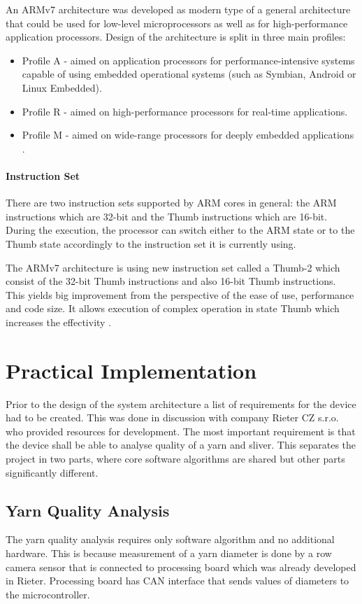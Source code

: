 \documentclass[twoside]{ctuthesis}
\theoremstyle{plain}
\theoremstyle{definition}
\theoremstyle{note}
\begin{document}
An ARMv7 architecture was developed as modern type of a general architecture that could be used for low-level microprocessors as well as for high-performance application processors. Design of the architecture is split in three main profiles:
\begin{itemize}
	\setlength{\itemsep}{5pt}
	\item Profile A - aimed on application processors for performance-intensive systems capable of using embedded operational systems (such as Symbian, Android or Linux Embedded).
	\item Profile R - aimed on high-performance processors for real-time applications.
	\item Profile M - aimed on wide-range processors for deeply embedded applications \cite{cite:ARM-M3}.
\end{itemize}

\subsubsection{Instruction Set}
There are two instruction sets supported by ARM cores in general: the ARM instructions which are 32-bit and the Thumb instructions which are 16-bit. During the execution, the processor can switch either to the ARM state or to the Thumb state accordingly to the instruction set it is currently using.

The ARMv7 architecture is using new instruction set called a Thumb-2 which consist of the 32-bit Thumb instructions and also 16-bit Thumb instructions. This yields big improvement from the perspective of the ease of use, performance and code size. It allows execution of complex operation in state Thumb which increases the effectivity \cite{cite:ARM-M3}.

\chapter{Practical Implementation}
Prior to the design of the system architecture a list of requirements for the device had to be created. This was done in discussion with company Rieter CZ s.r.o. who provided resources for development. The most important requirement is that the device shall be able to analyse quality of a yarn and sliver. This separates the project in two parts, where core software algorithms are shared but other parts significantly different. 

\section{Yarn Quality Analysis}
The yarn quality analysis requires only software algorithm and no additional hardware. This is because measurement of a yarn diameter is done by a row camera sensor that is connected to processing board which was already developed in Rieter. Processing board has CAN interface that sends values of diameters to the microcontroller. 
\end{document}
